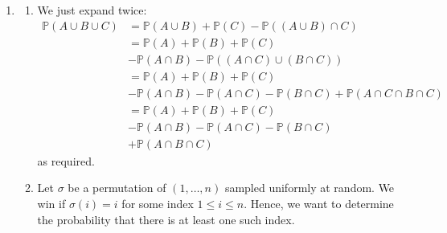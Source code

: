 \documentclass[12pt]{article}
\begin{document}
\begin{enumerate}
\begin{enumerate}
        This is monotonically increasing. When $k = 23,$ the above
        evaluates to $\sim 0.507,$ whereas when $k = 22,$ the above
        evaluates to $\sim 0.476,$ meaning $k_\text{birthday} = 23.$

      \item Let $E_{ab}$ denote the event that people $a$ and $b$
        share a birthday. The given argument computes
        $$
        \sum_{\{a, b\}} \mathbb P(E_{ab}) = {k \choose 2} \cdot \dfrac{1}{365},
        $$
        and treats this as $\mathbb P\left(\bigcup_{\{a,b\}}
        E_{ab}\right).$ But the events $E_{ab}$ are not mutually
        exclusive, so the probability of their union is not the sum
        of their probabilities.  E.g., $E_{ab}$ and $E_{bc}$ both
        occur whenever $a, b, c$ all share a birthday, and this
        outcome is counted twice in the sum. By the result of
        Question 1, the sum is only an upper bound:
        $$
        \mathbb P\left(\bigcup_{\{a,b\}} E_{ab}\right) \leq {k
        \choose 2} \cdot \dfrac{1}{365}.
        $$
    \end{enumerate}

  \item
    \begin{enumerate}
      \item We just expand twice:
        \begin{align*}
          \mathbb P(A \cup B \cup C) &= \mathbb P(A \cup B) + \mathbb
          P(C) - \mathbb P((A \cup B) \cap C) \\
          &= \mathbb P(A) + \mathbb P(B) + \mathbb P(C) \\ &- \mathbb
          P(A \cap B) - \mathbb P((A \cap C) \cup (B \cap C)) \\
          &= \mathbb P(A) + \mathbb P(B) + \mathbb P(C) \\ &- \mathbb
          P(A \cap B) - \mathbb P(A \cap C) - \mathbb P(B \cap C) +
          \mathbb P(A \cap C \cap B \cap C) \\
          &= \mathbb P(A) + \mathbb P(B) + \mathbb P(C) \\ &- \mathbb
          P(A \cap B) - \mathbb P(A \cap C) - \mathbb P(B \cap C)
          \\ &+ \mathbb P(A \cap B \cap C)
        \end{align*}
        as required.

      \item Let $\sigma$ be a permutation of $(1, \ldots, n)$ sampled
        uniformly at random. We win if $\sigma(i) = i$ for some index
        $1 \leq i \leq n.$ Hence, we want to determine the
        probability that there is at least one such index.


\end{enumerate}
\end{enumerate}
\end{document}
